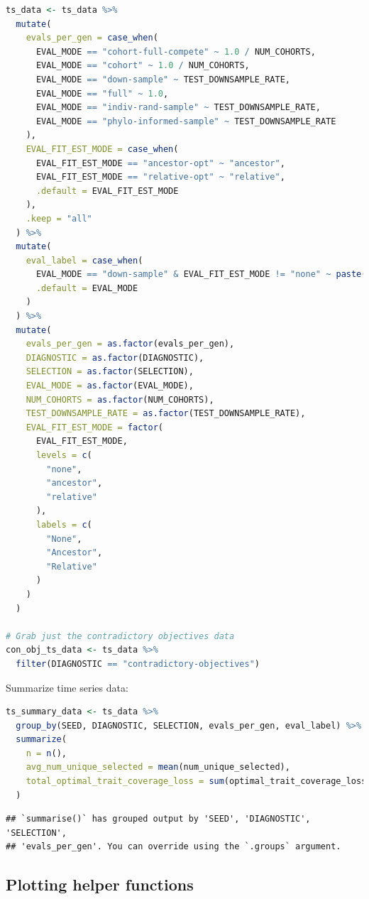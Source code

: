 \documentclass[
]{book}
\begin{document}
\begin{lstlisting}[language=R]
ts_data <- ts_data %>%
  mutate(
    evals_per_gen = case_when(
      EVAL_MODE == "cohort-full-compete" ~ 1.0 / NUM_COHORTS,
      EVAL_MODE == "cohort" ~ 1.0 / NUM_COHORTS,
      EVAL_MODE == "down-sample" ~ TEST_DOWNSAMPLE_RATE,
      EVAL_MODE == "full" ~ 1.0,
      EVAL_MODE == "indiv-rand-sample" ~ TEST_DOWNSAMPLE_RATE,
      EVAL_MODE == "phylo-informed-sample" ~ TEST_DOWNSAMPLE_RATE
    ),
    EVAL_FIT_EST_MODE = case_when(
      EVAL_FIT_EST_MODE == "ancestor-opt" ~ "ancestor",
      EVAL_FIT_EST_MODE == "relative-opt" ~ "relative",
      .default = EVAL_FIT_EST_MODE
    ),
    .keep = "all"
  ) %>%
  mutate(
    eval_label = case_when(
      EVAL_MODE == "down-sample" & EVAL_FIT_EST_MODE != "none" ~ paste("down-sample", EVAL_FIT_EST_MODE, sep="-"),
      .default = EVAL_MODE
    )
  ) %>%
  mutate(
    evals_per_gen = as.factor(evals_per_gen),
    DIAGNOSTIC = as.factor(DIAGNOSTIC),
    SELECTION = as.factor(SELECTION),
    EVAL_MODE = as.factor(EVAL_MODE),
    NUM_COHORTS = as.factor(NUM_COHORTS),
    TEST_DOWNSAMPLE_RATE = as.factor(TEST_DOWNSAMPLE_RATE),
    EVAL_FIT_EST_MODE = factor(
      EVAL_FIT_EST_MODE,
      levels = c(
        "none",
        "ancestor",
        "relative"
      ),
      labels = c(
        "None",
        "Ancestor",
        "Relative"
      )
    )
  )

# Grab just the contradictory objectives data
con_obj_ts_data <- ts_data %>%
  filter(DIAGNOSTIC == "contradictory-objectives")
\end{lstlisting}

Summarize time series data:

\begin{lstlisting}[language=R]
ts_summary_data <- ts_data %>%
  group_by(SEED, DIAGNOSTIC, SELECTION, evals_per_gen, eval_label) %>%
  summarize(
    n = n(),
    avg_num_unique_selected = mean(num_unique_selected),
    total_optimal_trait_coverage_loss = sum(optimal_trait_coverage_loss)
  )
\end{lstlisting}

\begin{lstlisting}
## `summarise()` has grouped output by 'SEED', 'DIAGNOSTIC', 'SELECTION',
## 'evals_per_gen'. You can override using the `.groups` argument.
\end{lstlisting}

\hypertarget{plotting-helper-functions-1}{%
\subsection{Plotting helper functions}\label{plotting-helper-functions-1}}
\end{document}
